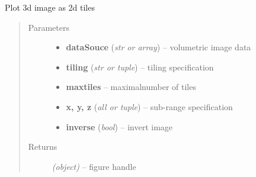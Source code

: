 \documentclass[letterpaper,10pt,english]{sphinxmanual}
\begin{document}
\begin{fulllineitems}
\label{api/ClearMap.Visualization:ClearMap.Visualization.Plot.plotTiling}
Plot 3d image as 2d tiles
\begin{quote}\begin{description}
\item[{Parameters}] \leavevmode\begin{itemize}
\item {} 
\textbf{dataSouce} (\emph{str or array}) --
volumetric image data

\item {} 
\textbf{tiling} (\emph{str or tuple}) --
tiling specification

\item {} 
\textbf{maxtiles} --
maximalnumber of tiles

\item {} 
\textbf{x, y, z} (\emph{all or tuple}) --
sub-range specification

\item {} 
\textbf{inverse} (\emph{bool}) --
invert image

\end{itemize}

\item[{Returns}] \leavevmode
\emph{(object)} --
figure handle

\end{description}\end{quote}

\end{fulllineitems}

\end{document}
